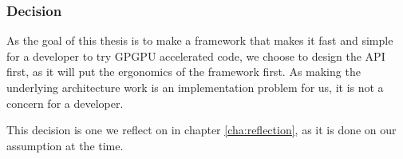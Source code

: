 %
%

\subsubsection{Decision}
As the goal of this thesis is to make a framework that makes it fast and simple for a developer to try GPGPU accelerated code, we choose to design the API first, as it will put the ergonomics of the framework first. As making the underlying architecture work is an implementation problem for us, it is not a concern for a developer.

This decision is one we reflect on in chapter \ref{cha:reflection}, as it is done on our assumption at the time.